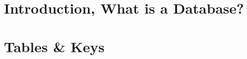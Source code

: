 \documentclass[openany]{book}
\begin{document}

\tableofcontents

\chapter{Introduction, What is a Database?}


\chapter{Tables \& Keys}


% 

% 

% 

% 

% 

% 

% 

% 
\end{document}
